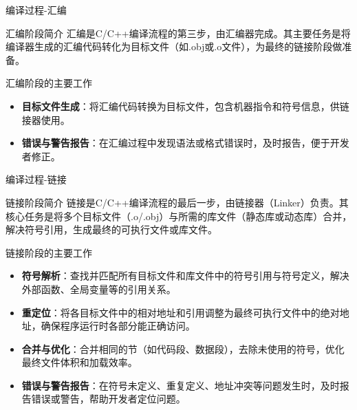 \documentclass[UTF8,aspectratio=169]{beamer}
\begin{document}
\begin{frame}{编译过程-汇编}
    \begin{ytublock}{汇编阶段简介}
        汇编是C/C++编译流程的第三步，由汇编器完成。其主要任务是将编译器生成的汇编代码转化为目标文件（如.obj或.o文件），为最终的链接阶段做准备。
    \end{ytublock}
    \begin{ytublock}{汇编阶段的主要工作}
        \begin{itemize}
            \item \textbf{目标文件生成}：将汇编代码转换为目标文件，包含机器指令和符号信息，供链接器使用。
            \item \textbf{错误与警告报告}：在汇编过程中发现语法或格式错误时，及时报告，便于开发者修正。
        \end{itemize}
    \end{ytublock}
\end{frame}

\begin{frame}{编译过程-链接}
    \begin{ytublock}{链接阶段简介}
        链接是C/C++编译流程的最后一步，由链接器（Linker）负责。其核心任务是将多个目标文件（.o/.obj）与所需的库文件（静态库或动态库）合并，解决符号引用，生成最终的可执行文件或库文件。
    \end{ytublock}
    \begin{ytublock}{链接阶段的主要工作}
        \small
        \begin{itemize}
            \item \textbf{符号解析}：查找并匹配所有目标文件和库文件中的符号引用与符号定义，解决外部函数、全局变量等的引用关系。
            \item \textbf{重定位}：将各目标文件中的相对地址和引用调整为最终可执行文件中的绝对地址，确保程序运行时各部分能正确访问。
            \item \textbf{合并与优化}：合并相同的节（如代码段、数据段），去除未使用的符号，优化最终文件体积和加载效率。
            \item \textbf{错误与警告报告}：在符号未定义、重复定义、地址冲突等问题发生时，及时报告错误或警告，帮助开发者定位问题。
        \end{itemize}
    \end{ytublock}
\end{frame}
\end{document}
